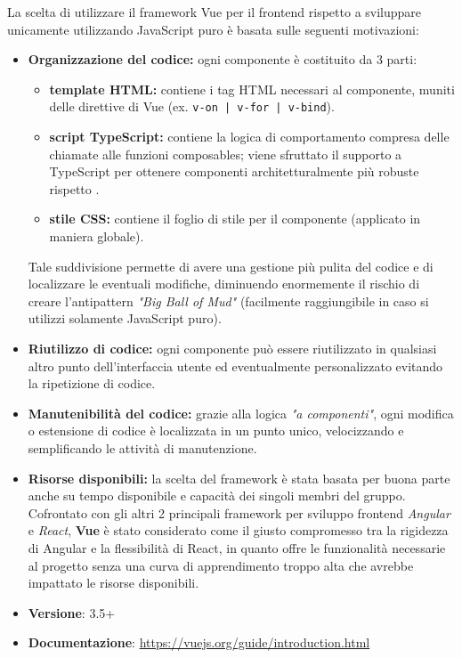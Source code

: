 \documentclass[a4paper,10pt]{article}
\begin{document}
La scelta di utilizzare il framework Vue per il frontend rispetto a sviluppare unicamente utilizzando JavaScript puro è basata sulle seguenti motivazioni:
    \begin{itemize}
        \item \textbf{Organizzazione del codice:} ogni componente è costituito da 3 parti: 
        \begin{itemize}
            \item \textbf{template HTML:} contiene i tag HTML necessari al componente, muniti delle direttive di Vue (ex. \texttt{v-on | v-for | v-bind}).
            \item \textbf{script TypeScript:} contiene la logica di comportamento compresa delle chiamate alle funzioni composables; viene sfruttato il supporto a TypeScript per ottenere componenti architetturalmente più robuste rispetto .
            \item \textbf{stile CSS:} contiene il foglio di stile per il componente (applicato in maniera globale).
        \end{itemize}
        Tale suddivisione permette di avere una gestione più pulita del codice e di localizzare le eventuali modifiche, diminuendo enormemente il rischio di creare l'antipattern \textit{"Big Ball of Mud"} (facilmente raggiungibile in caso si utilizzi solamente JavaScript puro).
        \item \textbf{Riutilizzo di codice:} ogni componente può essere riutilizzato in qualsiasi altro punto dell'interfaccia utente ed eventualmente personalizzato evitando la ripetizione di codice. 
        \item \textbf{Manutenibilità del codice:} grazie alla logica \textit{"a componenti"}, ogni modifica o estensione di codice è localizzata in un punto unico, velocizzando e semplificando le attività di manutenzione.  
        \item \textbf{Risorse disponibili:} la scelta del framework è stata basata per buona parte anche su tempo disponibile e capacità dei singoli membri del gruppo. Cofrontato con gli altri 2 principali framework per sviluppo frontend \textit{Angular} e \textit{React}, \textbf{Vue} è stato considerato come il giusto compromesso tra la rigidezza di Angular e la flessibilità di React, in quanto offre le funzionalità necessarie al progetto senza una curva di apprendimento troppo alta che avrebbe impattato le risorse disponibili.
    \end{itemize}

\begin{itemize}
    \item \textbf{Versione}: 3.5+
    \item \textbf{Documentazione}: \url{https://vuejs.org/guide/introduction.html}
\end{itemize}
\end{document}
